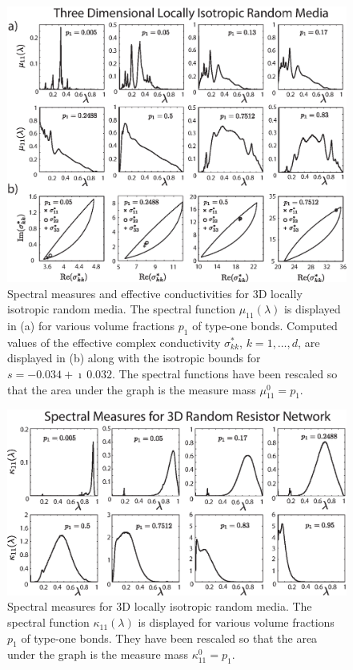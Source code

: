 \documentclass{cmslatex}
\begin{document}
%
\begin{figure}[t]
  \centerline{\includegraphics[scale=0.73]{3D_Spectral_Measures_Gamma.eps}} 
\caption{Spectral measures and effective conductivities for 3D locally
  isotropic random media. The spectral function $\mu_{11}(\lambda)$
  is displayed in (a) for various volume fractions $p_1$ of type-one
  bonds. Computed values of the effective complex conductivity
  $\sigma^*_{kk}$, $k=1,\ldots,d$, are displayed in (b) along with the isotropic
  bounds for $s=-0.034+\imath\,0.032$. The spectral functions have been
  rescaled so that the area under the graph is the measure mass
  $\mu^0_{11}=p_1$.                  
        }
\label{fig:3D_Spectral_Measures}
\end{figure}
%

%
\begin{figure}[t]
  \centerline{\includegraphics[scale=0.73]{3D_Spectral_Measure_GammaCurl.eps}} 
\caption{Spectral measures for 3D locally isotropic random media. The
  spectral function $\kappa_{11}(\lambda)$ is displayed for various volume
  fractions $p_1$ of type-one bonds. They have been
  rescaled so that the area under the graph is the measure mass
  $\kappa^0_{11}=p_1$.                  
        }
\label{fig:3D_Spectral_Measure_Curl}
\end{figure}
%
\end{document}
